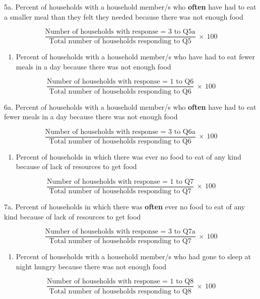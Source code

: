 \documentclass[12pt,]{book}
\providecommand{\tightlist}{%
  \setlength{\itemsep}{0pt}\setlength{\parskip}{0pt}}
\theoremstyle{definition}
\theoremstyle{definition}
\theoremstyle{definition}
\theoremstyle{remark}
\begin{document}
5a. Percent of households with a household member/s who \textbf{often}
have had to eat a smaller meal than they felt they needed because there
was not enough food

\[ \frac{\text{Number of households with response = 3 to Q5a}}{\text{Total number of households responding to Q5}} ~ \times ~ 100 \]

\begin{enumerate}
\def\labelenumi{\arabic{enumi}.}
\setcounter{enumi}{5}
\tightlist
\item
  Percent of households with a household member/s who have had to eat
  fewer meals in a day because there was not enough food
\end{enumerate}

\[ \frac{\text{Number of households with response = 1 to Q6}}{\text{Total number of households responding to Q6}} ~ \times ~ 100 \]

6a. Percent of households with a household member/s who \textbf{often}
have had to eat fewer meals in a day because there was not enough food

\[ \frac{\text{Number of households with response = 3 to Q6a}}{\text{Total number of households responding to Q6}} ~ \times ~ 100 \]

\begin{enumerate}
\def\labelenumi{\arabic{enumi}.}
\setcounter{enumi}{6}
\tightlist
\item
  Percent of households in which there was ever no food to eat of any
  kind because of lack of resources to get food
\end{enumerate}

\[ \frac{\text{Number of households with response = 1 to Q7}}{\text{Total number of households responding to Q7}} ~ \times ~ 100 \]

7a. Percent of households in which there was \textbf{often} ever no food
to eat of any kind because of lack of resources to get food

\[ \frac{\text{Number of households with response = 3 to Q7a}}{\text{Total number of households responding to Q7}} ~ \times ~ 100 \]

\begin{enumerate}
\def\labelenumi{\arabic{enumi}.}
\setcounter{enumi}{7}
\tightlist
\item
  Percent of households with a household member/s who had gone to sleep
  at night hungry because there was not enough food
\end{enumerate}

\[ \frac{\text{Number of households with response = 1 to Q8}}{\text{Total number of households responding to Q8}} ~ \times ~ 100 \]
\end{document}
